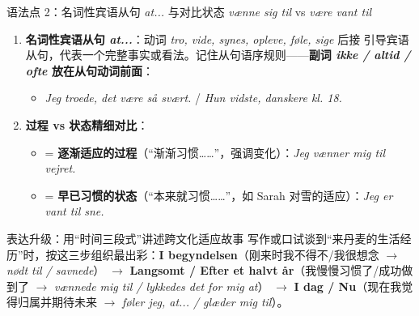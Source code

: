 \begin{grammatikbox}{语法点 2：名词性宾语从句 \textit{at...} 与对比状态 \textit{vænne sig til} vs \textit{være vant til}}
\begin{enumerate}
  \item \textbf{名词性宾语从句 \textit{at...}}：动词 \textit{tro, vide, synes, opleve, føle, sige} 后接  引导宾语从句，代表一个完整事实或看法。记住从句语序规则——\textbf{副词 \textit{ikke / altid / ofte} 放在从句动词前面}：
    \begin{itemize}
      \item \textit{Jeg troede,  det  være så svært.} / \textit{Hun vidste,  danskere  kl. 18.}
    \end{itemize}
  \item \textbf{过程 vs 状态精细对比}：
    \begin{itemize}
      \item {} = \textbf{逐渐适应的过程}（“渐渐习惯……”，强调变化）：\textit{Jeg vænner mig til vejret.}
      \item {} = \textbf{早已习惯的状态}（“本来就习惯……”，如 Sarah 对雪的适应）：\textit{Jeg er vant til sne.}
    \end{itemize}
\end{enumerate}
\end{grammatikbox}

\begin{grammatikbox}{表达升级：用“时间三段式”讲述跨文化适应故事}
写作或口试谈到“来丹麦的生活经历”时，按这三步组织最出彩：\textbf{I begyndelsen}（刚来时我不得不/我很想念 $\rightarrow$ \textit{nødt til / savnede}） $\rightarrow$ \textbf{Langsomt / Efter et halvt år}（我慢慢习惯了/成功做到了 $\rightarrow$ \textit{vænnede mig til / lykkedes det for mig at}） $\rightarrow$ \textbf{I dag / Nu}（现在我觉得归属并期待未来 $\rightarrow$ \textit{føler jeg, at... / glæder mig til}）。
\end{grammatikbox}


